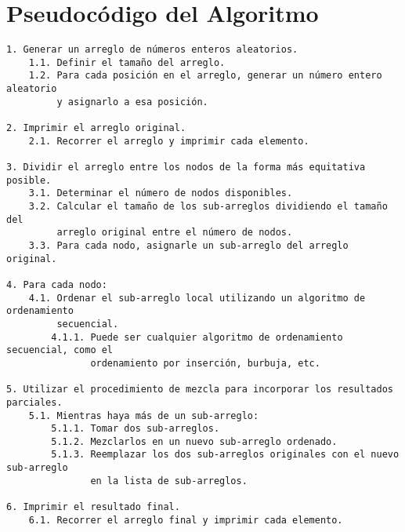 \documentclass[a4paper,12pt]{article}
\begin{document}
\section*{Pseudocódigo del Algoritmo}


\begin{verbatim}
1. Generar un arreglo de números enteros aleatorios.
    1.1. Definir el tamaño del arreglo.
    1.2. Para cada posición en el arreglo, generar un número entero aleatorio
         y asignarlo a esa posición.

2. Imprimir el arreglo original.
    2.1. Recorrer el arreglo y imprimir cada elemento.

3. Dividir el arreglo entre los nodos de la forma más equitativa posible.
    3.1. Determinar el número de nodos disponibles.
    3.2. Calcular el tamaño de los sub-arreglos dividiendo el tamaño del 
         arreglo original entre el número de nodos.
    3.3. Para cada nodo, asignarle un sub-arreglo del arreglo original.

4. Para cada nodo:
    4.1. Ordenar el sub-arreglo local utilizando un algoritmo de ordenamiento
         secuencial.
        4.1.1. Puede ser cualquier algoritmo de ordenamiento secuencial, como el
               ordenamiento por inserción, burbuja, etc.

5. Utilizar el procedimiento de mezcla para incorporar los resultados parciales.
    5.1. Mientras haya más de un sub-arreglo:
        5.1.1. Tomar dos sub-arreglos.
        5.1.2. Mezclarlos en un nuevo sub-arreglo ordenado.
        5.1.3. Reemplazar los dos sub-arreglos originales con el nuevo sub-arreglo
               en la lista de sub-arreglos.

6. Imprimir el resultado final.
    6.1. Recorrer el arreglo final y imprimir cada elemento.
\end{verbatim}

\end{document}

